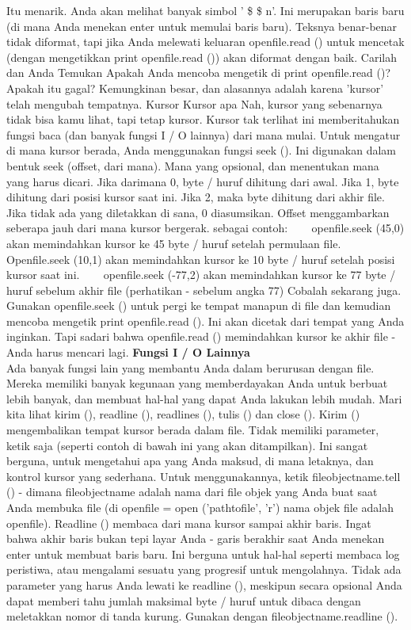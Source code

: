 Itu menarik. Anda akan melihat banyak simbol ' \$  \setminus  \$ n'. Ini merupakan baris baru (di mana Anda menekan enter untuk memulai baris baru). Teksnya benar-benar tidak diformat, tapi jika Anda melewati keluaran openfile.read () untuk mencetak (dengan mengetikkan print openfile.read ()) akan diformat dengan baik. Carilah dan Anda Temukan Apakah Anda mencoba mengetik di print openfile.read ()? Apakah itu gagal? Kemungkinan besar, dan alasannya adalah karena 'kursor' telah mengubah tempatnya. Kursor Kursor apa Nah, kursor yang sebenarnya tidak bisa kamu lihat, tapi tetap kursor. Kursor tak terlihat ini memberitahukan fungsi baca (dan banyak fungsi I / O lainnya) dari mana mulai. Untuk mengatur di mana kursor berada, Anda menggunakan fungsi seek (). Ini digunakan dalam bentuk seek (offset, dari mana). Mana yang opsional, dan menentukan mana yang harus dicari. Jika darimana 0, byte / huruf dihitung dari awal. Jika 1, byte dihitung dari posisi kursor saat ini. Jika 2, maka byte dihitung dari akhir file. Jika tidak ada yang diletakkan di sana, 0 diasumsikan.  
Offset menggambarkan seberapa jauh dari mana kursor bergerak. sebagai contoh: 
~~~ openfile.seek (45,0) akan memindahkan kursor ke 45 byte / huruf setelah permulaan file. 
~~~ Openfile.seek (10,1) akan memindahkan kursor ke 10 byte / huruf setelah posisi kursor saat ini.  
~~~ openfile.seek (-77,2) akan memindahkan kursor ke 77 byte / huruf sebelum akhir file (perhatikan - sebelum angka 77) 
Cobalah sekarang juga. Gunakan openfile.seek () untuk pergi ke tempat manapun di file dan kemudian mencoba mengetik print openfile.read (). Ini akan dicetak dari tempat yang Anda inginkan. Tapi sadari bahwa openfile.read () memindahkan kursor ke akhir file - Anda harus mencari lagi.  
{\fontsize{14pt}{14pt}\selectfont \textbf{Fungsi I / O Lainnya} \\} 
Ada banyak fungsi lain yang membantu Anda dalam berurusan dengan file. Mereka memiliki banyak kegunaan yang memberdayakan Anda untuk berbuat lebih banyak, dan membuat hal-hal yang dapat Anda lakukan lebih mudah. Mari kita lihat kirim (), readline (), readlines (), tulis () dan close (). Kirim () mengembalikan tempat kursor berada dalam file. Tidak memiliki parameter, ketik saja (seperti contoh di bawah ini yang akan ditampilkan). Ini sangat berguna, untuk mengetahui apa yang Anda maksud, di mana letaknya, dan kontrol kursor yang sederhana. Untuk menggunakannya, ketik fileobjectname.tell () - dimana fileobjectname adalah nama dari file objek yang Anda buat saat Anda membuka file (di openfile = open ('pathtofile', 'r') nama objek file adalah openfile). Readline () membaca dari mana kursor sampai akhir baris. Ingat bahwa akhir baris bukan tepi layar Anda - garis berakhir saat Anda menekan enter untuk membuat baris baru. Ini berguna untuk hal-hal seperti membaca log peristiwa, atau mengalami sesuatu yang progresif untuk mengolahnya. Tidak ada parameter yang harus Anda lewati ke readline (), meskipun secara opsional Anda dapat memberi tahu jumlah maksimal byte / huruf untuk dibaca dengan meletakkan nomor di tanda kurung. Gunakan dengan fileobjectname.readline (). 
